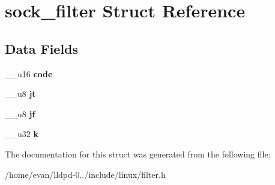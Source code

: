 \section{sock\-\_\-filter \-Struct \-Reference}
\label{structsock__filter}
\subsection*{\-Data \-Fields}
\begin{DoxyCompactItemize}
\item 
\-\_\-\-\_\-u16 {\bfseries code}\label{structsock__filter_ac399a2838bc70bcca48d11a5d7a4d6e0}

\item 
\-\_\-\-\_\-u8 {\bfseries jt}\label{structsock__filter_a6caf24cae32afc688a5c7fbab7703f94}

\item 
\-\_\-\-\_\-u8 {\bfseries jf}\label{structsock__filter_a9b75791eead9124f28a19600fdc2d7b9}

\item 
\-\_\-\-\_\-u32 {\bfseries k}\label{structsock__filter_a31c62d60846f21b5f2e6ba1444637ad8}

\end{DoxyCompactItemize}


\-The documentation for this struct was generated from the following file\-:\begin{DoxyCompactItemize}
\item 
/home/evan/lldpd-\/0../include/linux/filter.\-h\end{DoxyCompactItemize}
